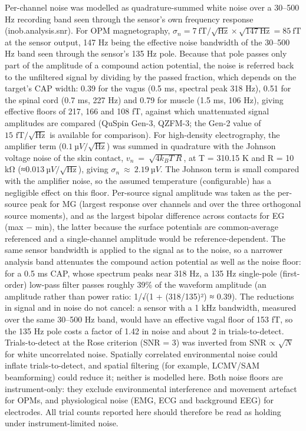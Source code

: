 \documentclass[11pt]{article}
\newcommand{\revised}[1]{#1}
\begin{document}
Per-channel noise was modelled as quadrature-summed white noise over a
30--500 Hz recording band seen through the sensor's own
frequency response (inob.analysis.snr). For OPM magnetography,
\revised{\(\sigma_{n} = 7\ \text{fT}/\sqrt{\text{Hz}} \times \sqrt{147\ \text{Hz}} = 85\ \text{fT}\)
at the sensor output, 147 Hz being the effective noise bandwidth of the
30--500 Hz band seen through the sensor's 135 Hz pole. Because that
pole passes only part of the amplitude of a compound action potential,
the noise is referred back to the unfiltered signal by dividing by the
passed fraction, which depends on the target's CAP width: 0.39 for the
vagus (0.5 ms, spectral peak 318 Hz), 0.51 for the spinal cord (0.7 ms,
227 Hz) and 0.79 for muscle (1.5 ms, 106 Hz), giving effective floors
of 217, 166 and 108 fT,} against which unattenuated signal amplitudes are
compared (QuSpin Gen-3, QZFM-3; the Gen-2 value of
\(\text{15 fT/}\sqrt{\text{Hz}}\) is available for comparison). For
high-density electrography, the amplifier term (\(0.1\ µV/\sqrt{\text{Hz}}\)) was summed in
quadrature with the Johnson voltage noise of the skin contact,
\(v_{n}\  = \ \sqrt{4k_{B}T\ R}\), at T = 310.15 K and R = 10 kΩ
(≈\(0.013\ µV/\sqrt{\text{Hz}}\)), giving
\(\sigma_{n}\  \approx \ 2.19\ µV\). The Johnson term is small compared
with the amplifier noise, so the assumed temperature (configurable) has
a negligible effect on this floor. Per-source signal amplitude was taken
as the per-source peak for MG (largest response over channels and over
the three orthogonal source moments), and as the largest bipolar
difference across contacts for EG (max − min), the latter because the
surface potentials are common-average referenced and a single-channel
amplitude would be reference-dependent. The same sensor bandwidth is
applied to the signal as to the noise, so a narrower analysis band
attenuates the compound action potential as well as the noise floor: for
a 0.5 ms CAP, whose spectrum peaks near 318 Hz, a 135 Hz single-pole
(first-order) low-pass filter passes roughly 39\% of the waveform
amplitude (an amplitude rather than power ratio: 1/√(1 + (318/135)²) ≈
0.39). \revised{The reductions in signal and in noise do not cancel: a sensor with a
1 kHz bandwidth, measured over the same 30--500 Hz band, would have an
effective vagal floor of 153 fT, so the 135 Hz pole costs a factor of
1.42 in noise and about 2 in trials-to-detect.} Trials-to-detect at the Rose
criterion (SNR = 3) was inverted from \(\text{SNR ∝ }\sqrt{N}\) for
white uncorrelated noise. Spatially correlated environmental noise could
inflate trials-to-detect, and spatial filtering (for example, LCMV/SAM
beamforming) could reduce it; neither is modelled here. Both noise
floors are instrument-only: they exclude environmental interference and
movement artefact for OPMs, and physiological noise (EMG, ECG and
background EEG) for electrodes. All trial counts reported here should
therefore be read as holding under instrument-limited noise.
\end{document}
